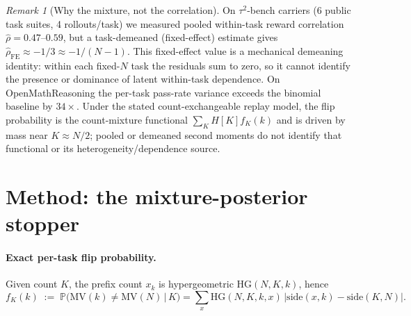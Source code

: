 \documentclass{article}
\theoremstyle{definition}
\theoremstyle{remark}
\newtheorem{remark}{Remark}
\newcommand{\HG}{\mathrm{HG}}
\newcommand{\MV}{\mathrm{MV}}
\renewcommand{\P}{\mathbb{P}}
\begin{document}
\begin{remark}[Why the mixture, not the correlation]
\label{rem:pooled}
On $\tau^2$-bench carriers (6 public task suites, 4 rollouts/task) we measured
pooled within-task reward correlation $\hat\rho=0.47$--$0.59$, but a
task-demeaned (fixed-effect) estimate gives $\hat\rho_{\mathrm{FE}}\approx-1/3
\approx-1/(N-1)$.  This fixed-effect value is a mechanical demeaning identity:
within each fixed-$N$ task the residuals sum to zero, so it cannot identify
the presence or dominance of latent within-task dependence.  On
OpenMathReasoning the per-task pass-rate variance exceeds the binomial
baseline by $34\times$. Under the stated count-exchangeable replay model, the
flip probability is the count-mixture functional $\sum_K H[K]f_K(k)$ and is
driven by mass near $K\approx N/2$; pooled or demeaned second moments do not
identify that functional or its heterogeneity/dependence source.
\end{remark}

\section{Method: the mixture-posterior stopper}
\label{sec:method}

\paragraph{Exact per-task flip probability.}
Given count $K$, the prefix count $x_k$ is hypergeometric
$\HG(N,K,k)$, hence
\begin{equation}
f_K(k) \;:=\; \P\big(\MV(k)\neq\MV(N)\,\big|\,K\big)
= \sum_{x}\HG(N,K,k,x)\,\big|\mathrm{side}(x,k)-\mathrm{side}(K,N)\big|.
\label{eq:exact}
\end{equation}
\end{document}
